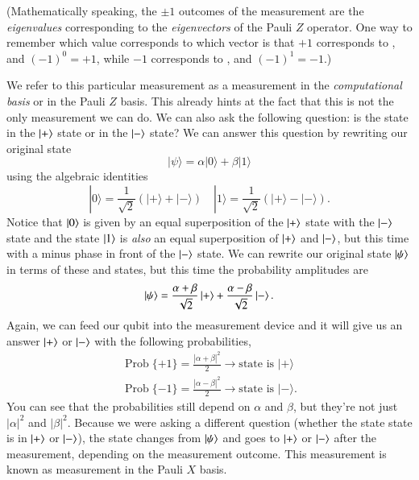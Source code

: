  (Mathematically speaking, the $\pm 1$ outcomes of the measurement are the \emph{eigenvalues} corresponding to the \emph{eigenvectors} of the Pauli $Z$ operator.  One way to remember which value corresponds to which vector is that $+1$ corresponds to , and $(-1)^0 = +1$, while $-1$ corresponds to , and $(-1)^1 = -1$.)

We refer to this particular measurement as a measurement in the \emph{computational basis} or in the Pauli $Z$ basis. This already hints at the fact that this is not the only measurement we can do. We can also ask the following question: is the state in the $\left| + \right\rangle$ state or in the $\left| - \right\rangle$ state? We can answer this question by rewriting our original state
\begin{equation}
|\psi\rangle=\alpha|0\rangle+\beta|1\rangle
\end{equation}
using the algebraic identities
\begin{equation}
|0\rangle=\frac{1}{\sqrt{2}}(|+\rangle+|-\rangle) \quad|1\rangle=\frac{1}{\sqrt{2}}(|+\rangle-|-\rangle).
\end{equation}
Notice that $\left| 0 \right\rangle$ is given by an equal superposition of the $\left| + \right\rangle$ state with the $\left| - \right\rangle$ state and the state $\left| 1 \right\rangle$ is \emph{also} an equal superposition of $\left| + \right\rangle$ and $\left| - \right\rangle$, but this time with a minus phase in front of the $\left| - \right\rangle$ state. We can rewrite our original state $\left| \psi \right\rangle$ in terms of these \ket{+} and \ket{-} states, but this time the probability amplitudes are
\begin{equation}
\left| \psi \right\rangle=\frac{\alpha+\beta}{\sqrt{2}}\left| + \right\rangle+\frac{\alpha-\beta}{\sqrt{2}}\left| - \right\rangle.
\end{equation}
Again, we can feed our qubit into the measurement device and it will give us an answer $\left| + \right\rangle$ or $\left| - \right\rangle$ with the following probabilities,
\begin{align}
\label{eq:plus-measurement}
\operatorname{Prob}\{+1\}=\frac{|\alpha+\beta|^2}{2} \rightarrow \textrm{state is } |+\rangle \\
\label{eq:minus-measurement}
\operatorname{Prob}\{-1\}=\frac{|\alpha-\beta|^2}{2} \rightarrow \textrm{state is } |-\rangle.
\end{align}
You can see that the probabilities still depend on $\alpha$ and $\beta$, but they're not just $|\alpha|^2$ and $|\beta|^2$.
Because we were asking a different question (whether the state state is in $\left| + \right\rangle$ or $\left| - \right\rangle$), the state changes from $\left| \psi \right\rangle$ and goes to $\left| + \right\rangle$ or $\left| - \right\rangle$ after the measurement, depending on the measurement outcome. This measurement is known as measurement in the Pauli $X$ basis.

